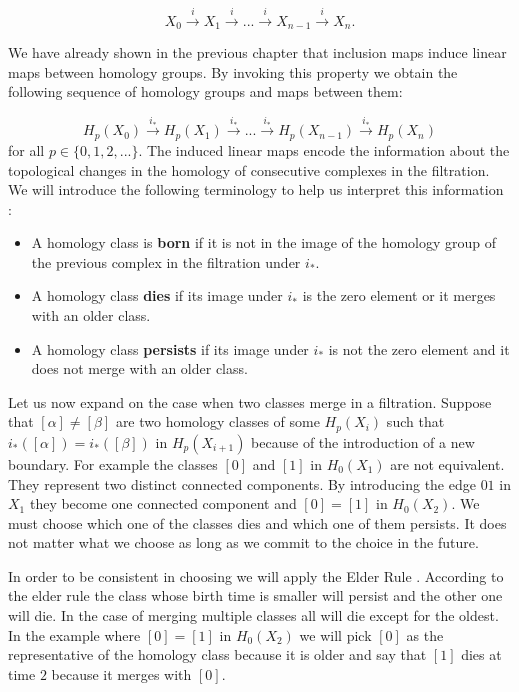 $$ X_0 \overset{i}{\longrightarrow} X_1 \overset{i}{\longrightarrow} ... \overset{i}{\longrightarrow} X_{n-1} \overset{i}{\longrightarrow} X_n .$$

We have already shown in the previous chapter that inclusion maps induce linear maps between homology groups. By invoking this property we obtain the following sequence of homology groups and maps between them:

$$ H_p(X_0) \overset{i_*}{\longrightarrow} H_p(X_1) \overset{i_*}{\longrightarrow} ... \overset{i_*}{\longrightarrow} H_p(X_{n-1}) \overset{i_*}{\longrightarrow} H_p(X_n) $$
for all $p \in \{0, 1, 2, ...\}$. The induced linear maps encode the information about the topological changes in the homology of consecutive complexes in the filtration. We will introduce the following terminology to help us interpret this information \cite{elementary-applied-topology}:

\begin{itemize}
    \item A homology class is \textbf{born} if it is not in the image of the homology group of the previous complex in the filtration under $i_*$.
    \item A homology class \textbf{dies} if its image under $i_*$ is the zero element or it merges with an older class.
    \item A homology class \textbf{persists} if its image under $i_*$ is not the zero element and it does not merge with an older class.
\end{itemize}

Let us now expand on the case when two classes merge in a filtration. Suppose that $[\alpha] \ne [\beta]$ are two homology classes of some $H_p(X_i)$ such that $i_*([\alpha]) = i_*([\beta])$ in $H_p(X_{i+1})$ because of the introduction of a new boundary. For example the classes $[0]$ and $[1]$ in $H_0(X_1)$ are not equivalent. They represent two distinct connected components. By introducing the edge $01$ in $X_1$ they become one connected component and $[0] = [1]$ in $H_0(X_2)$. We must choose which one of the classes dies and which one of them persists. It does not matter what we choose as long as we commit to the choice in the future.

In order to be consistent in choosing we will apply the Elder Rule \cite[p.~150]{comp-topo}. According to the elder rule the class whose birth time is smaller will persist and the other one will die. In the case of merging multiple classes all will die except for the oldest. In the example where $[0] = [1]$ in $H_0(X_2)$ we will pick $[0]$ as the representative of the homology class because it is older and say that $[1]$ dies at time $2$ because it merges with $[0]$.

